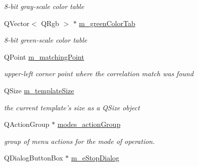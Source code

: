 \begin{DoxyCompactItemize}
\begin{DoxyCompactList}\small\item\em 8-\/bit gray-\/scale color table \item\end{DoxyCompactList}\item 
\hypertarget{classQcorr_a795a9f4f9805a241f55c59a0a520f3d4}{
QVector$<$ QRgb $>$ $\ast$ \hyperlink{classQcorr_a795a9f4f9805a241f55c59a0a520f3d4}{m\_\-greenColorTab}}
\label{classQcorr_a795a9f4f9805a241f55c59a0a520f3d4}

\begin{DoxyCompactList}\small\item\em 8-\/bit green-\/scale color table \item\end{DoxyCompactList}\item 
\hypertarget{classQcorr_a8a7f00160ae46441cef038149cf28bdc}{
QPoint \hyperlink{classQcorr_a8a7f00160ae46441cef038149cf28bdc}{m\_\-matchingPoint}}
\label{classQcorr_a8a7f00160ae46441cef038149cf28bdc}

\begin{DoxyCompactList}\small\item\em upper-\/left corner point where the correlation match was found \item\end{DoxyCompactList}\item 
\hypertarget{classQcorr_abc48bdd2110cfdaf7b98dde1cdf42f18}{
QSize \hyperlink{classQcorr_abc48bdd2110cfdaf7b98dde1cdf42f18}{m\_\-templateSize}}
\label{classQcorr_abc48bdd2110cfdaf7b98dde1cdf42f18}

\begin{DoxyCompactList}\small\item\em the current template's size as a QSize object \item\end{DoxyCompactList}\item 
\hypertarget{classQcorr_a3a964df80562c062d5f1f4f6cbf841bb}{
QActionGroup $\ast$ \hyperlink{classQcorr_a3a964df80562c062d5f1f4f6cbf841bb}{modes\_\-actionGroup}}
\label{classQcorr_a3a964df80562c062d5f1f4f6cbf841bb}

\begin{DoxyCompactList}\small\item\em group of menu actions for the mode of operation. \item\end{DoxyCompactList}\item 
\hypertarget{classQcorr_a496beab48555a8c9abbd6f6aa48e52fb}{
QDialogButtonBox $\ast$ \hyperlink{classQcorr_a496beab48555a8c9abbd6f6aa48e52fb}{m\_\-eStopDialog}}
\label{classQcorr_a496beab48555a8c9abbd6f6aa48e52fb}


\end{DoxyCompactItemize}
